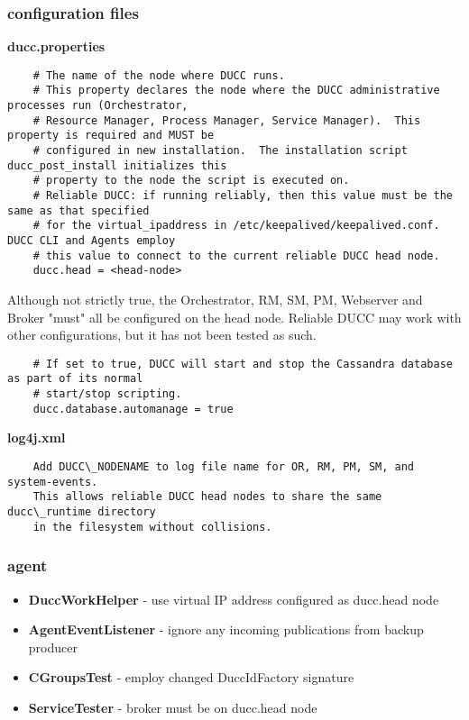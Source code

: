 \documentclass[letterpaper]{article}
\begin{document}
\subsubsection{configuration files}

\textbf{ducc.properties}  

   \begin{verbatim}
    # The name of the node where DUCC runs.
    # This property declares the node where the DUCC administrative processes run (Orchestrator,
    # Resource Manager, Process Manager, Service Manager).  This property is required and MUST be
    # configured in new installation.  The installation script ducc_post_install initializes this 
    # property to the node the script is executed on.
    # Reliable DUCC: if running reliably, then this value must be the same as that specified
    # for the virtual_ipaddress in /etc/keepalived/keepalived.conf.  DUCC CLI and Agents employ
    # this value to connect to the current reliable DUCC head node.
    ducc.head = <head-node>
   \end{verbatim}

Although not strictly true, the Orchestrator, RM, SM, PM, Webserver and Broker "must"
all be configured on the head node.  Reliable DUCC may work with other configurations,
but it has not been tested as such.

	\begin{verbatim}
	# If set to true, DUCC will start and stop the Cassandra database as part of its normal
	# start/stop scripting.  
	ducc.database.automanage = true
	\end{verbatim}

\textbf{log4j.xml}

   \begin{verbatim}
    Add DUCC\_NODENAME to log file name for OR, RM, PM, SM, and system-events.
    This allows reliable DUCC head nodes to share the same ducc\_runtime directory
    in the filesystem without collisions.
   \end{verbatim}

\subsubsection{agent}

{\renewcommand\labelitemi{}
\begin{itemize}
  \item \textbf{DuccWorkHelper} - use virtual IP address configured as ducc.head node
  \item \textbf{AgentEventListener} - ignore any incoming publications from backup producer
  \item \textbf{CGroupsTest} - employ changed DuccIdFactory signature
  \item \textbf{ServiceTester} - broker must be on ducc.head node
\end{itemize}
}
\end{document}

